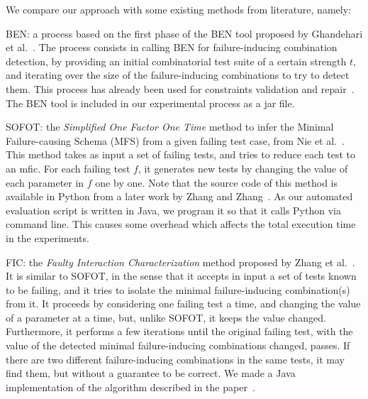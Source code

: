 \documentclass[
12pt, %
oneside, %
english, %
singlespacing, %
headsepline, %
consistentlayout, %
]{MastersDoctoralThesis} %
\newcommand{\mfic}{\textsf{mfic}\xspace}
\theoremstyle{plain}
\theoremstyle{definition}
\theoremstyle{remark}
\theoremstyle{plain}
\theoremstyle{plain}
\theoremstyle{remark}
\begin{document}
We compare our approach with some existing methods from literature, namely:
%
\begin{asparadesc}
	\item[BEN:] a process based on the first phase of the BEN tool proposed by Ghandehari et al.~\cite{ben_2015}. The process consists in calling BEN for failure-inducing combination detection, by providing an initial combinatorial test suite of a certain strength $t$, and iterating over the size of the failure-inducing combinations to try to detect them. This process has already been used for constraints validation and repair~\cite{Gargantini16:validation,gargantini_combinatorial_2017}. The BEN tool is included in our experimental process as a jar file.
	\item[SOFOT:] the \textit{Simplified One Factor One Time} method to infer the Minimal Failure-causing Schema (\textsf{MFS}) from a given failing test case, from Nie et al.~\cite{nie_2011}. This method takes as input a set of failing tests, and tries to reduce each test to an \mfic. For each failing test $f$, it generates new tests by changing the value of each parameter in $f$ one by one. Note that the source code of this method is available in Python from a later work by Zhang and Zhang~\cite{zhang_characterizing_2011}. As our automated evaluation script is written in Java, we program it so that it calls Python via command line. This causes some overhead which affects the total execution time in the experiments.
	\item[FIC:] the \textit{Faulty Interaction Characterization} method proposed by Zhang et al.~\cite{zhang_characterizing_2011}. It is similar to SOFOT, in the sense that it accepts in input a set of tests known to be failing, and it tries to isolate the minimal failure-inducing combination(s) from it. It proceeds by considering one failing test a time, and changing the value of a parameter at a time, but, unlike SOFOT, it keeps the value changed. Furthermore, it performs a few iterations until the original failing test, with the value of the detected minimal failure-inducing combinations changed, passes. If there are two different failure-inducing combinations in the same tests, it may find them, but without a guarantee to be correct. We made a Java implementation of the algorithm described in the paper~\cite{zhang_characterizing_2011}.

\end{asparadesc}
\end{document}
